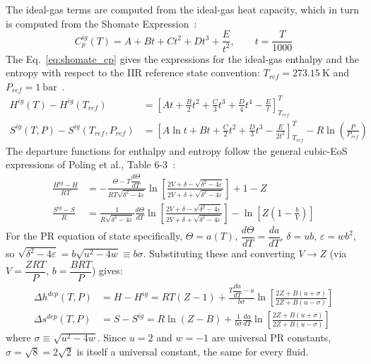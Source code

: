 \documentclass{article}
\begin{document}
The ideal-gas terms are computed from the ideal-gas heat capacity, which in turn is computed from the Shomate Expression~\cite{shomate1954}:
\begin{equation}\label{eq:shomate_cp}
    C_p^{ig}(T) = A + Bt + Ct^2 + Dt^3 + \frac{E}{t^2}, \qquad t = \frac{T}{1000}
\end{equation}
The Eq.~\eqref{eq:shomate_cp} gives the expressions for the ideal-gas enthalpy and the entropy with respect to the IIR reference state convention: $T_{ref} =\SI{273.15}{\kelvin}$ and $P_{ref} = 1~\text{bar}$~\cite{ashrae2009}.
\begin{subequations}
\begin{align}
    H^{ig}(T) - H^{ig}(T_{ref}) &= \left[At + \frac{B}{2}t^2 + \frac{C}{3}t^3 + \frac{D}{4}t^4 - \frac{E}{t}\right]_{T_{ref}}^{T} \label{eq:ideal_enthalpy} \\
    S^{ig}(T,P) - S^{ig}(T_{ref},P_{ref}) &= \left[A\ln t + Bt + \frac{C}{2}t^2 + \frac{D}{3}t^3 - \frac{E}{2t^2}\right]_{T_{ref}}^{T} - R\ln\left(\frac{P}{P_{ref}}\right) \label{eq:ideal_entropy}
\end{align}
\end{subequations}
The departure functions for enthalpy and entropy follow the general
cubic-EoS expressions of Poling et al., Table 6-3~\cite{poling2001}:
\begin{subequations}
\begin{align}
    \frac{H^{ig}-H}{RT} &= -\frac{\Theta - T\dfrac{d\Theta}{dT}}{RT\sqrt{\delta^2-4\varepsilon}}\ln\left[\frac{2V+\delta-\sqrt{\delta^2-4\varepsilon}}{2V+\delta+\sqrt{\delta^2-4\varepsilon}}\right] + 1 - Z \\
    \frac{S^{ig}-S}{R} &= \frac{1}{R\sqrt{\delta^2-4\varepsilon}}\frac{d\Theta}{dT}\ln\left[\frac{2V+\delta-\sqrt{\delta^2-4\varepsilon}}{2V+\delta+\sqrt{\delta^2-4\varepsilon}}\right] - \ln\left[Z\left(1-\frac{b}{V}\right)\right]
\end{align}
\end{subequations}
For the PR equation of state specifically, $\Theta=a(T)$, $\dfrac{d\Theta}{dT}=\dfrac{da}{dT}$, $\delta=ub$, $\varepsilon=wb^2$, so $\sqrt{\delta^2-4\varepsilon}=b\sqrt{u^2-4w}\equiv b\sigma$. Substituting these and converting $V\to Z$ (via $V=\dfrac{ZRT}{P}$, $b=\dfrac{BRT}{P}$) gives:
\begin{subequations}
\begin{align}
    \Delta h^{dep}(T,P) &= H - H^{ig} = RT(Z-1) + \frac{T\dfrac{da}{dT} - a}{b\sigma}\ln\left[\frac{2Z+B(u+\sigma)}{2Z+B(u-\sigma)}\right]\label{eq:dh_dep} \\
    \Delta s^{dep}(T,P) &= S - S^{ig} = R\ln(Z-B) + \frac{1}{b\sigma}\frac{da}{dT}\ln\left[\frac{2Z+B(u+\sigma)}{2Z+B(u-\sigma)}\right]\label{eq:ds_dep}
\end{align}
\end{subequations}
where $\sigma \equiv \sqrt{u^2-4w}$. Since $u=2$ and $w=-1$ are universal
PR constants, $\sigma=\sqrt{8}=2\sqrt{2}$ is itself a universal constant,
the same for every fluid.
\end{document}
